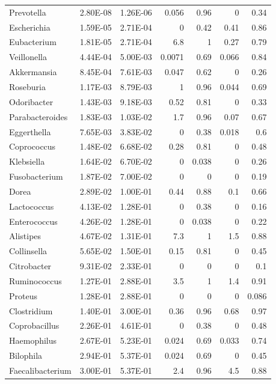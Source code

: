 {\begin{longtable}{ | l | r | r | r | r | r | r  | }
		
		Prevotella & 2.80E-08 & 1.26E-06 & 0.056 & 0.96 & 0 & 0.34 \\ 
		Escherichia & 1.59E-05 & 2.71E-04 & 0 & 0.42 & 0.41 & 0.86 \\ 
		Eubacterium & 1.81E-05 & 2.71E-04 & 6.8 & 1 & 0.27 & 0.79 \\ 
		Veillonella & 4.44E-04 & 5.00E-03 & 0.0071 & 0.69 & 0.066 & 0.84 \\ 
		Akkermansia & 8.45E-04 & 7.61E-03 & 0.047 & 0.62 & 0 & 0.26 \\ 
		Roseburia & 1.17E-03 & 8.79E-03 & 1 & 0.96 & 0.044 & 0.69 \\ 
		Odoribacter & 1.43E-03 & 9.18E-03 & 0.52 & 0.81 & 0 & 0.33 \\ 
		Parabacteroides & 1.83E-03 & 1.03E-02 & 1.7 & 0.96 & 0.07 & 0.67 \\ 
		Eggerthella & 7.65E-03 & 3.83E-02 & 0 & 0.38 & 0.018 & 0.6 \\ 
		Coprococcus & 1.48E-02 & 6.68E-02 & 0.28 & 0.81 & 0 & 0.48 \\ 
		Klebsiella & 1.64E-02 & 6.70E-02 & 0 & 0.038 & 0 & 0.26 \\ 
		Fusobacterium & 1.87E-02 & 7.00E-02 & 0 & 0 & 0 & 0.19 \\ 
		Dorea & 2.89E-02 & 1.00E-01 & 0.44 & 0.88 & 0.1 & 0.66 \\ 
		Lactococcus & 4.13E-02 & 1.28E-01 & 0 & 0.38 & 0 & 0.16 \\ 
		Enterococcus & 4.26E-02 & 1.28E-01 & 0 & 0.038 & 0 & 0.22 \\ 
		Alistipes & 4.67E-02 & 1.31E-01 & 7.3 & 1 & 1.5 & 0.88 \\ 
		Collinsella & 5.65E-02 & 1.50E-01 & 0.15 & 0.81 & 0 & 0.45 \\ 
		Citrobacter & 9.31E-02 & 2.33E-01 & 0 & 0 & 0 & 0.1 \\ 
		Ruminococcus & 1.27E-01 & 2.88E-01 & 3.5 & 1 & 1.4 & 0.91 \\ 
		Proteus & 1.28E-01 & 2.88E-01 & 0 & 0 & 0 & 0.086 \\ 
		Clostridium & 1.40E-01 & 3.00E-01 & 0.36 & 0.96 & 0.68 & 0.97 \\ 
		Coprobacillus & 2.26E-01 & 4.61E-01 & 0 & 0.38 & 0 & 0.48 \\ 
		Haemophilus & 2.67E-01 & 5.23E-01 & 0.024 & 0.69 & 0.033 & 0.74 \\ 
		Bilophila & 2.94E-01 & 5.37E-01 & 0.024 & 0.69 & 0 & 0.45 \\ 
		Faecalibacterium & 3.00E-01 & 5.37E-01 & 2.4 & 0.96 & 4.5 & 0.88 \\ 

\end{longtable}}
